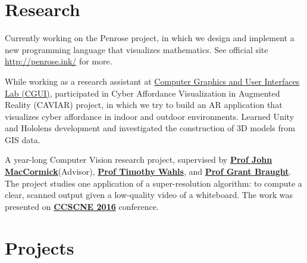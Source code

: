 \documentclass[]{deedy-resume-openfont}
\begin{document}
\begin{minipage}[t]{0.66\textwidth} 



\section{Research}
Currently working on the Penrose project, in which we design and implement a new programming language that visualizes mathematics. See official site \href{http://penrose.ink/}{http://penrose.ink/} for more.
\sectionsep

While working as a research assistant at \href{http://graphics.cs.columbia.edu/kenny/home/home/}{Computer Graphics and User Interfaces Lab (CGUI)}, participated in Cyber Affordance Visualization in Augmented Reality (CAVIAR) project, in which we try to build an AR application that visualizes cyber affordance in indoor and outdoor environments. Learned Unity and Hololens development and investigated the construction of 3D models from GIS data.
\sectionsep

A year-long Computer Vision research project, supervised by \textbf{\href{http://users.dickinson.edu/~jmac/}{Prof John MacCormick}}(Advisor), \textbf{\href{http://users.dickinson.edu/~wahlst/}{Prof Timothy Wahls}}, and \textbf{\href{http://users.dickinson.edu/~braught/?}{Prof Grant Braught}}. The project studies one application of a super-resolution algorithm: to compute a clear, scanned output given a low-quality video of a whiteboard. The work was presented on \textbf{\href{http://ccscne.org/conferences/ccscne-2016/}{CCSCNE 2016}} conference.
\sectionsep



\section{Projects}


\end{minipage}
\end{document}
